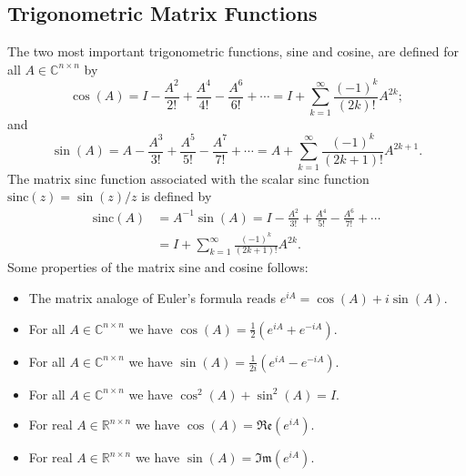 \subsection{Trigonometric Matrix Functions}
\label{sec:trigonometricmatrixfunctions}

The two most important trigonometric functions, sine and cosine, are defined
\cite{higham2008functions} for all $A \in \mathbb{C}^{n \times n}$ by
\begin{equation}
    \label{eq:matrixcosinedefinition}
    \cos(A) = I - \frac{A^2}{2!} + \frac{A^4}{4!} - \frac{A^6}{6!} + \cdots
    = I + \sum_{k=1}^{\infty}{\frac{(-1)^k}{(2k)!} A^{2k}};
\end{equation}
and
\begin{equation}
    \label{eq:matrixsinedefinition}
    \sin(A) = A - \frac{A^3}{3!} + \frac{A^5}{5!} - \frac{A^7}{7!} + \cdots
    = A + \sum_{k=1}^{\infty}{\frac{(-1)^k}{(2k+1)!} A^{2k+1}}.
\end{equation}
The matrix sinc function associated with the scalar sinc function
$\mathrm{sinc}(z) = \sin(z) / z$ is defined by
\begin{equation}
    \label{eq:matrixsincdefinition}
    \begin{aligned}
        \mathrm{sinc}(A) & = A^{-1} \sin(A)
        = I - \frac{A^2}{3!} + \frac{A^4}{5!} - \frac{A^6}{7!} + \cdots \\
        & = I + \sum_{k=1}^{\infty}{\frac{(-1)^k}{(2k+1)!} A^{2k}}.
    \end{aligned}
\end{equation}
Some properties of the matrix sine and cosine follows:
\begin{itemize}
    \item The matrix analoge of Euler's formula reads $e^{iA} = \cos(A) + i \sin(A)$.
    \item For all $A \in \mathbb{C}^{n \times n}$ we have $\cos(A) = \frac{1}{2} (e^{iA} + e^{-iA})$.
    \item For all $A \in \mathbb{C}^{n \times n}$ we have $\sin(A) = \frac{1}{2i} (e^{iA} - e^{-iA})$.
    \item For all $A \in \mathbb{C}^{n \times n}$ we have $\cos^2(A) + \sin^2(A) = I$.
    \item For real $A \in \mathbb{R}^{n \times n}$ we have $\cos(A) = \mathfrak{Re}(e^{iA})$.
    \item For real $A \in \mathbb{R}^{n \times n}$ we have $\sin(A) = \mathfrak{Im}(e^{iA})$.
\end{itemize}

